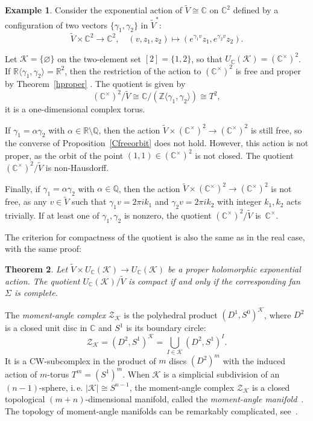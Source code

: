 \documentclass[a4paper]{amsart}
\newtheorem{theorem}{Theorem}[section]
\theoremstyle{definition}
\newtheorem{example}[theorem]{Example}
\theoremstyle{remark}
\numberwithin{equation}{section}
\def\R{\mathbb R}
\def\C{\mathbb C}
\def\Q{\mathbb Q}
\def\R{\mathbb R}
\def\Z{\mathbb Z}
\def\sK{\mathcal K}
\newcommand{\zk}{\mathcal Z_{\mathcal K}}
\newcommand{\<}{\langle}
\renewcommand{\>}{\rangle}
\begin{document}
\begin{example}\label{2gamma}
Consider the exponential action of $\widetilde V\cong\C$ on $\C^2$ defined by a configuration of two vectors $\{\gamma_1,\gamma_2\}$ in $\widetilde V^*$:
\[
   \widetilde V\times\C^2\to\C^2,\quad (v,z_1,z_2)\mapsto
   (e^{\gamma_1v}z_1,e^{\gamma_2v}z_2).
\]

Let $\sK=\{\varnothing\}$ on the two-element set $[2]=\{1,2\}$, so that
$U_\C(\sK)=(\C^\times)^2$.
If $\R\langle\gamma_1,\gamma_2\rangle=\R^2$, then the restriction of the action to $(\C^\times)^2$ is free and proper by Theorem~\ref{hproper} . The quotient is given by
\[
  (\C^\times)^2/\widetilde V\cong \C/(\Z\langle\gamma_1,\gamma_2\rangle)
  \cong T^2,
\]
it is a one-dimensional complex torus.

If $\gamma_1=\alpha\gamma_2$ with $\alpha\in\R\setminus\Q$, then the action 
$\widetilde V\times(\C^\times)^2\to(\C^\times)^2$ is still free, so the converse of Proposition~\ref{Cfreeorbit} does not hold. However, this action is not proper, as the orbit of the point $(1,1)\in(\C^\times)^2$ is not closed. The quotient 
$(\C^\times)^2/\widetilde V$ is non-Hausdorff.

Finally, if $\gamma_1=\alpha\gamma_2$ with $\alpha\in\Q$, then the action $\widetilde V\times(\C^\times)^2\to(\C^\times)^2$ is not free, as any $v\in\widetilde V$ such that 
$\gamma_1v=2\pi ik_1$ and $\gamma_2v=2\pi ik_2$ with integer $k_1,k_2$ acts trivially. If at least one of $\gamma_1,\gamma_2$ is nonzero, the quotient $(\C^\times)^2/\widetilde V$ is~$\C^\times$. 
\end{example}

The criterion for compactness of the quotient is also the same as in the real case, with the same proof:

\begin{theorem}\label{hcompact}
Let $\widetilde V\times U_\C(\sK)\to U_\C(\sK)$ be a proper holomorphic exponential action.
The quotient $U_\C(\sK)/\widetilde V$ is compact if and only if the corresponding fan $\Sigma$ is complete.
\end{theorem}

The \emph{moment-angle complex} $\zk$ is the polyhedral product 
$(D^1,S^0)^\sK$, where $D^2$ is a closed unit disc in $\C$ and $S^1$ is
its boundary circle:
\begin{equation}\label{madec}
  \zk=(D^2,S^1)^\sK=\bigcup_{I\in\sK}(D^2,S^1)^I.
\end{equation}
It is a CW-subcomplex in the product of $m$ discs $(D^2)^m$ with the induced action of $m$-torus $T^m=(S^1)^m$. When $\sK$ is a simplicial subdivision of an $(n-1)$-sphere, i.\,e. $|\sK|\cong S^{n-1}$, the moment-angle complex $\zk$ is a closed topological $(m+n)$-dimensional manifold, called the \emph{moment-angle manifold}~\cite[Theorem~4.1.4]{bu-pa15}. The topology of moment-angle manifolds can be remarkably complicated, see~\cite[Chapter~4]{bu-pa15}.
\end{document}
